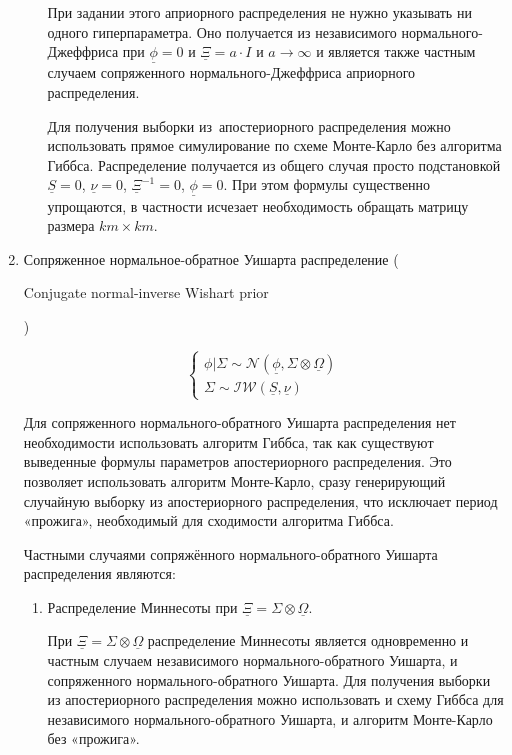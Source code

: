\documentclass[11pt]{article} %
\newcommand{\cN}{\mathcal{N}}
\newcommand{\cIW}{\mathcal{IW}}
\newcommand{\prior}{\underline}
\newcommand{\eng}[1]{\begin{otherlanguage}{english}#1\end{otherlanguage}}
\begin{document}
\begin{enumerate}
\begin{enumerate}
При задании этого априорного распределения не нужно указывать ни одного
гиперпараметра. Оно получается из независимого нормального-Джеффриса при $\prior\phi=0$ и $\prior\Xi= a\cdot I$ и $a\to \infty$ и является также частным случаем сопряженного нормального-Джеффриса априорного распределения.


Для получения выборки из~апостериорного распределения можно
использовать прямое симулирование по схеме Монте-Карло без алгоритма
Гиббса. %
Распределение получается из общего случая просто подстановкой $\prior
S=0$, $\prior \nu =0$, $\prior \Xi^{-1}=0$, $\prior\phi=0$. При этом
формулы существенно упрощаются, в частности исчезает необходимость
обращать матрицу размера $km\times km$.


\end{enumerate}

\item Сопряженное нормальное-обратное Уишарта распределение (\eng{Conjugate normal-inverse Wishart prior})


\begin{equation}
\begin{cases}
\phi|\Sigma\sim \cN (\prior \phi, \Sigma\otimes\prior \Omega)\\
\Sigma\sim \cIW(\prior S, \prior \nu)
\end{cases}
\end{equation}


Для сопряженного нормального-обратного Уишарта распределения нет
необходимости использовать алгоритм Гиббса, так как существуют выведенные формулы
параметров апостериорного распределения. Это позволяет использовать алгоритм
Монте-Карло, сразу генерирующий случайную выборку из апостериорного
распределения, что исключает период «прожига», необходимый для сходимости
алгоритма Гиббса.


Частными случаями сопряжённого нормального-обратного Уишарта
распределения являются:

\begin{enumerate}

\item Распределение Миннесоты при  $\prior \Xi =  \Sigma \otimes
\prior \Omega $.



При $\prior \Xi =  \Sigma \otimes \prior \Omega $ распределение
Миннесоты является одновременно и частным случаем независимого
нормального-обратного Уишарта, и сопряженного нормального-обратного
Уишарта. Для получения выборки из апостериорного распределения можно
использовать и схему Гиббса для независимого нормального-обратного
Уишарта, и алгоритм Монте-Карло без «прожига».




\end{enumerate}
\end{enumerate}
\end{document}
